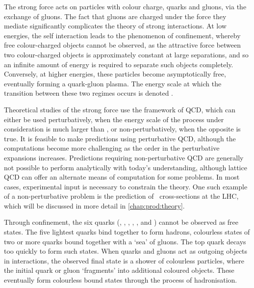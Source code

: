 \begin{table}
  \centering
  \caption{%
    Properties of the fundamental particles of the \acl{SM}~\cite{PDG2014}. The
    electric charge is given in units of the electron charge.
  }
  \label{tab:intro:sm:particles}
  
\end{table}

The strong force acts on particles with colour charge, quarks and gluons, via 
the exchange of gluons.
The fact that gluons are charged under the force they mediate significantly 
complicates the theory of strong interactions.
At low energies, the self interaction leads to the phenomenon of confinement, 
whereby free colour-charged objects cannot be observed, as the attractive force 
between two colour-charged objects is approximately constant at large 
separations, and so an infinite amount of energy is required to separate such 
objects completely.
Conversely, at higher energies, these particles become asymptotically free, 
eventually forming a quark-gluon plasma.
The energy scale at which the transition between these two regimes occurs is 
denoted \qcdscale.

Theoretical studies of the strong force use the framework of \ac{QCD}, which 
can either be used perturbatively, when the energy scale of the process under 
consideration is much larger than \qcdscale, or non-perturbatively, when the 
opposite is true.
It is feasible to make predictions using perturbative \ac{QCD}, although the 
computations become more challenging as the order in the perturbative 
expansions increases.
Predictions requiring non-perturbative \ac{QCD} are generally not possible to 
perform analytically with today's understanding, although lattice \ac{QCD} can 
offer an alternate means of computation for some problems.
In most cases, experimental input is necessary to constrain the theory.
One such example of a non-perturbative problem is the prediction of \pp\ 
cross-sections at the \ac{LHC}, which will be discussed in more detail in 
\cref{chap:prod:theory}.

Through confinement, the six quarks (\Pup, \Pdown, \Pcharm, \Pstrange, \Ptop, 
and \Pbottom) cannot be observed as free states.
The five lightest quarks bind together to form hadrons, colourless states of 
two or more quarks bound together with a `sea' of gluons.
The top quark decays too quickly to form such states.
When quarks and gluons act as outgoing objects in interactions, the observed 
final state is a shower of colourless particles, where the initial quark or 
gluon `fragments' into additional coloured objects.
These eventually form colourless bound states through the process of 
hadronisation.

